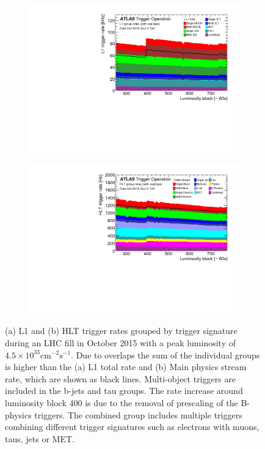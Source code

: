 \begin{figure}[h]
\begin{center}
\begin{subfigure}[b]{\textwidth}
\centering
      \includegraphics[width=\textwidth]{fig/content_menu_figures_Time_L1GroupRate_Stack.png}
     \caption{}
      \label{fig:L1_menu_rates}
  \end{subfigure}
 \begin{subfigure}[b]{\textwidth}
 \centering
      \includegraphics[width=\textwidth]{fig/content_menu_figures_Time_HLTGroupRate_Stack.png}
      \caption{}
      \label{fig:HLT_menu_rates}
  \end{subfigure}
\caption{(a) L1 and (b) HLT trigger rates grouped by trigger signature during an LHC fill in October 2015 with a peak luminosity of $4.5\times10^{33}\text{cm}^{-2}\text{s}^{-1}$. Due to overlaps the sum of the individual groups is higher than the (a) L1 total rate and (b) Main physics stream rate, which are shown as black lines. Multi-object triggers are included in the b-jets and tau groups. The rate increase around luminosity block 400 is due to the removal of prescaling of the B-physics triggers. The combined group includes multiple triggers combining different trigger signatures such as electrons with muons, taus, jets or MET.~\cite{Aaboud2017}} \label{fig:Trigger_singlelepton}
\end{center}
\end{figure}
